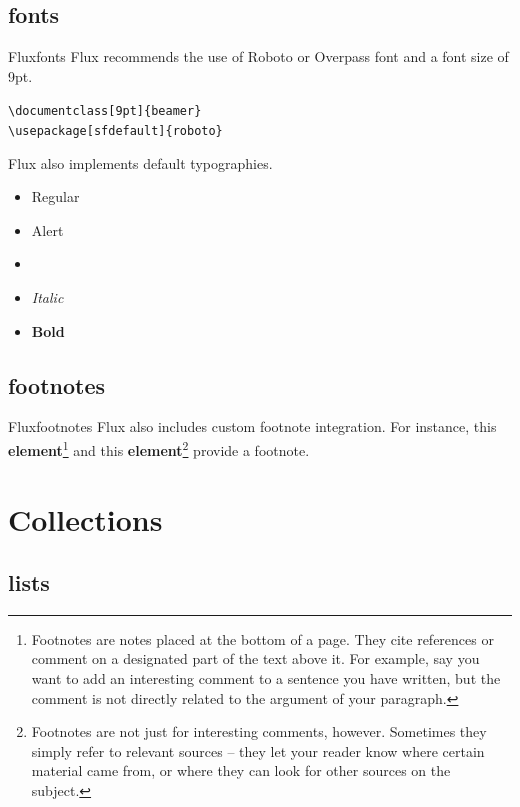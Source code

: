 \documentclass[9pt]{beamer}
\begin{document}
\subsection{fonts}

\begin{frame}[fragile]{Flux}{fonts}
 Flux recommends the use of Roboto or Overpass font and a font size of 9pt.\\[0.2cm]
 \begin{center}
 	\verb+\documentclass[9pt]{beamer}+\\
	\verb+\usepackage[sfdefault]{roboto}+
 \end{center}
 
  Flux also implements default typographies.

	\begin{itemize}
		\item Regular
		\item \alert{Alert}
		\item {}
		\item \textit{Italic}
		\item \textbf{Bold}
	\end{itemize}
	
\end{frame}

\subsection{footnotes}

\begin{frame}{Flux}{footnotes}
		Flux also includes custom footnote integration. For instance, this \textbf{element}\footnote{Footnotes are notes placed at the bottom of a page. They cite references or comment on a designated part of the text above it. For example, say you want to add an interesting comment to a sentence you have written, but the comment is not directly related to the argument of your paragraph. } and this \textbf{element}\footnote{Footnotes are not just for interesting comments, however. Sometimes they simply refer to relevant sources -- they let your reader know where certain material came from, or where they can look for other sources on the subject.} provide a footnote.
\end{frame}

\section{Collections}
\subsection{lists}
\end{document}
